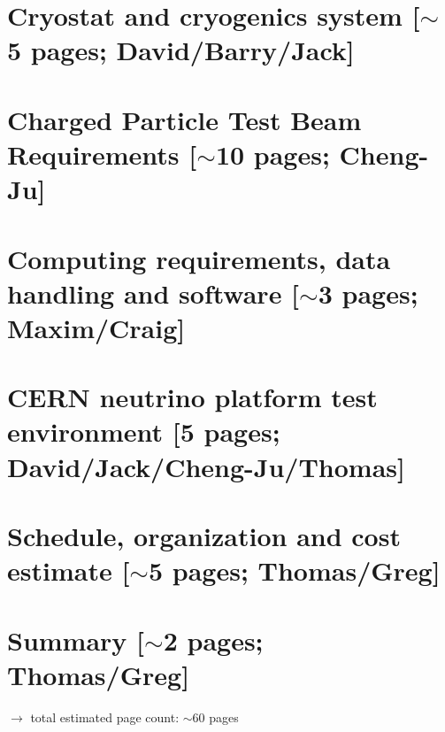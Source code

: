 \documentclass[12pt]{article}
\begin{document}
	


\section{Cryostat and cryogenics system [$\sim$5 pages; {\color{red} David/Barry/Jack}]}
	

\newpage
\section{Charged Particle Test Beam Requirements [$\sim$10 pages; {\color{red} Cheng-Ju}]}
	


\section{Computing requirements, data handling and software  [$\sim$3 pages; {\color{red} Maxim/Craig}]}
	

\section{CERN neutrino platform test environment [5 pages; {\color{red} David/Jack/Cheng-Ju/Thomas}]}
	
	
	
\section{Schedule, organization and cost estimate [$\sim$5 pages; {\color{red} Thomas/Greg}]}
	

\section{Summary [$\sim$2 pages; {\color{red} Thomas/Greg}]}
	




{\color{red}
$\rightarrow$ total estimated page count: $\sim$60 pages}
\end{document}
